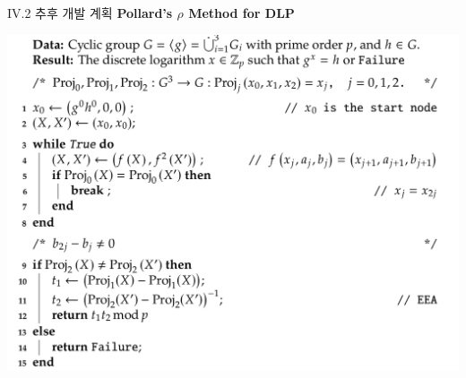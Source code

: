 \documentclass{beamer}
\begin{document}
\begin{frame}{IV.2 추후 개발 계획}
	\alert{\bf Pollard's $\rho$ Method for DLP}\\
	\begin{center}
		\includegraphics[scale=.225]{rho.png}
	\end{center}
\end{frame}
\end{document}
